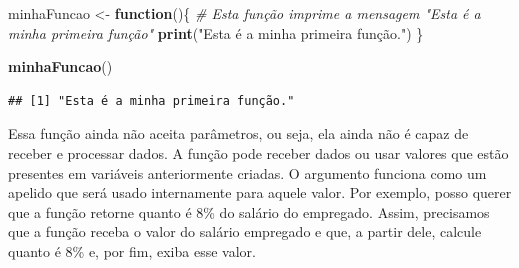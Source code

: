 \documentclass[
]{book}
\newenvironment{Shaded}{\begin{snugshade}}{\end{snugshade}}
\newcommand{\CommentTok}[1]{\textcolor[rgb]{0.56,0.35,0.01}{\textit{#1}}}
\newcommand{\ControlFlowTok}[1]{\textcolor[rgb]{0.13,0.29,0.53}{\textbf{#1}}}
\newcommand{\FloatTok}[1]{\textcolor[rgb]{0.00,0.00,0.81}{#1}}
\newcommand{\KeywordTok}[1]{\textcolor[rgb]{0.13,0.29,0.53}{\textbf{#1}}}
\newcommand{\NormalTok}[1]{#1}
\newcommand{\OperatorTok}[1]{\textcolor[rgb]{0.81,0.36,0.00}{\textbf{#1}}}
\newcommand{\StringTok}[1]{\textcolor[rgb]{0.31,0.60,0.02}{#1}}
\begin{document}
\begin{Shaded}
\begin{Highlighting}[]
\NormalTok{minhaFuncao <-}\StringTok{ }\ControlFlowTok{function}\NormalTok{()\{}
  \CommentTok{# Esta função imprime a mensagem "Esta é a minha primeira função"}
  \KeywordTok{print}\NormalTok{(}\StringTok{"Esta é a minha primeira função."}\NormalTok{)}
\NormalTok{\}}
\end{Highlighting}
\end{Shaded}

\begin{Shaded}
\begin{Highlighting}[]
\KeywordTok{minhaFuncao}\NormalTok{()}
\end{Highlighting}
\end{Shaded}

\begin{verbatim}
## [1] "Esta é a minha primeira função."
\end{verbatim}

Essa função ainda não aceita parâmetros, ou seja, ela ainda não é capaz de receber e processar dados. A função pode receber dados ou usar valores que estão presentes em variáveis anteriormente criadas. O argumento funciona como um apelido que será usado internamente para aquele valor. Por exemplo, posso querer que a função retorne quanto é 8\% do salário do empregado. Assim, precisamos que a função receba o valor do salário empregado e que, a partir dele, calcule quanto é 8\% e, por fim, exiba esse valor.

\begin{Shaded}
\end{Shaded}
\end{document}

